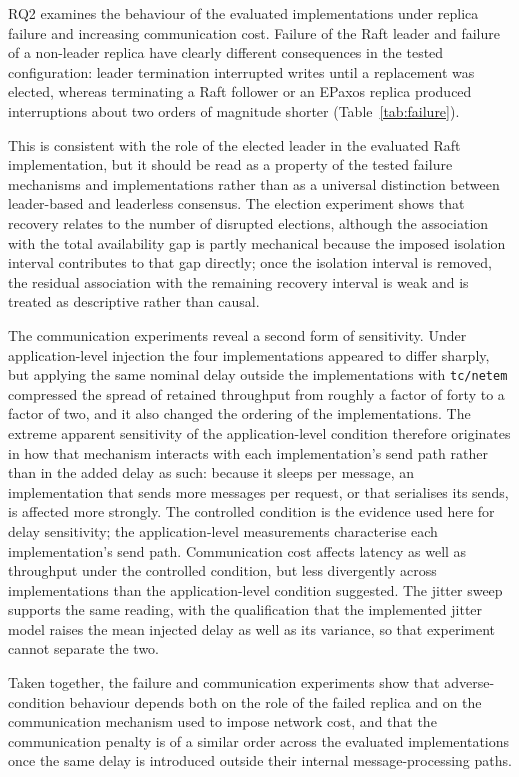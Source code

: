 RQ2 examines the behaviour of the evaluated implementations under replica
failure and increasing communication cost. Failure of the Raft leader and
failure of a non-leader replica have clearly different consequences in the
tested configuration: leader termination interrupted writes until a
replacement was elected, whereas terminating a Raft follower or an EPaxos
replica produced interruptions about two orders of magnitude shorter
(Table~\ref{tab:failure}).

This is consistent with the role of the elected leader in the evaluated Raft
implementation, but it should be read as a property of the tested failure
mechanisms and implementations rather than as a universal distinction
between leader-based and leaderless consensus. The election experiment shows
that recovery relates to the number of disrupted elections, although the
association with the total availability gap is partly mechanical because the
imposed isolation interval contributes to that gap directly; once the
isolation interval is removed, the residual association with the remaining
recovery interval is weak and is treated as descriptive rather than causal.

The communication experiments reveal a second form of sensitivity. Under
application-level injection the four implementations appeared to differ
sharply, but applying the same nominal delay outside the implementations
with \texttt{tc/netem} compressed the spread of retained throughput from
roughly a factor of forty to a factor of two, and it also changed the
ordering of the implementations. The extreme apparent sensitivity of the
application-level condition therefore originates in how that mechanism
interacts with each implementation's send path rather than in the added
delay as such: because it sleeps per message, an implementation that sends
more messages per request, or that serialises its sends, is affected more
strongly. The controlled condition is the evidence used here for delay
sensitivity; the application-level measurements characterise each
implementation's send path. Communication cost affects latency as well as
throughput under the controlled condition, but less divergently across
implementations than the application-level condition suggested. The jitter
sweep supports the same reading, with the qualification that the implemented
jitter model raises the mean injected delay as well as its variance, so that
experiment cannot separate the two.

Taken together, the failure and communication experiments show that
adverse-condition behaviour depends both on the role of the failed replica
and on the communication mechanism used to impose network cost, and that the
communication penalty is of a similar order across the evaluated
implementations once the same delay is introduced outside their internal
message-processing paths.

